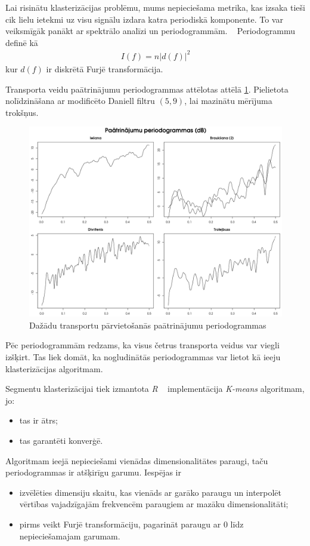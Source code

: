 \documentclass{ludis}
\begin{document}
Lai risinātu klasterizācijas problēmu, mums nepieciešama metrika, kas izsaka tieši cik lielu 
ietekmi uz visu signālu izdara katra periodiskā komponente. To var veiksmīgāk panākt ar 
spektrālo analīzi un periodogrammām. ~\cite{bloomfield2004} Periodogrammu definē kā
\begin{align*}
  I(f) = n | d(f) |^2
\end{align*}
kur $d(f)$ ir diskrētā Furjē transformācija.

Transporta veidu paātrinājumu periodogrammas attēlotas attēlā \ref{fig:periodograms}. Pielietota
nolīdzināšana ar modificēto Daniell filtru $(5, 9)$, lai mazinātu mērījuma trokšņus.

\begin{figure}
  \centering
  \includegraphics[scale=0.5]{img/periodograms}
  \caption{Dažādu transportu pārvietošanās paātrinājumu periodogrammas}
  \label{fig:periodograms}
\end{figure}

Pēc periodogrammām redzams, ka visus četrus transporta veidus var viegli izšķirt. Tas liek domāt,
ka nogludinātās periodogrammas var lietot kā ieeju klasterizācijas algoritmam.

Segmentu klasterizācijai tiek izmantota \emph{R} ~\cite{Rcore} implementācija \emph{K-means} 
algoritmam, jo:
\begin{itemize}
\item tas ir ātrs;
\item tas garantēti konverģē.
\end{itemize}

Algoritmam ieejā nepieciešami vienādas dimensionalitātes paraugi, taču periodogrammas ir atšķirīgu
garumu. Iespējas ir 
\begin{itemize}
\item izvēlēties dimensiju skaitu, kas vienāds ar garāko paraugu un interpolēt vērtības 
  vajadzīgajām frekvencēm paraugiem ar mazāku dimensionalitāti;
\item pirms veikt Furjē transformāciju, pagarināt paraugu ar $0$ līdz nepieciešamajam garumam.
\end{itemize}
\end{document}
